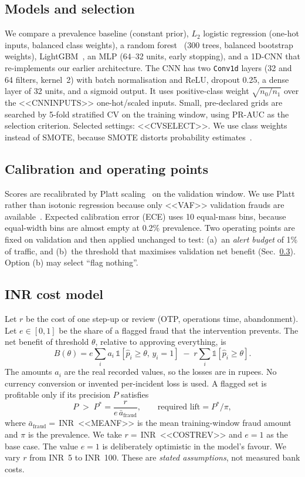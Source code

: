 \documentclass[conference]{IEEEtran}
\newcommand{\inr}{INR~}
\begin{document}
\subsection{Models and selection}\label{sec:models}
We compare a prevalence baseline (constant prior), $L_2$ logistic regression (one-hot inputs, balanced class weights), a random forest~\cite{breiman2001} (300 trees, balanced bootstrap weights), LightGBM~\cite{ke2017}, an MLP (64--32 units, early stopping), and a 1D-CNN that re-implements our earlier architecture. The CNN has two \texttt{Conv1d} layers (32 and 64 filters, kernel~2) with batch normalisation and ReLU, dropout 0.25, a dense layer of 32 units, and a sigmoid output. It uses positive-class weight $\sqrt{n_0/n_1}$ over the <<CNNINPUTS>> one-hot/scaled inputs. Small, pre-declared grids are searched by 5-fold stratified CV on the training window, using PR-AUC as the selection criterion. Selected settings: <<CVSELECT>>. We use class weights instead of SMOTE, because SMOTE distorts probability estimates~\cite{dalpozzolo2015}.

\subsection{Calibration and operating points}
Scores are recalibrated by Platt scaling~\cite{platt1999} on the validation window. We use Platt rather than isotonic regression because only <<VAF>> validation frauds are available~\cite{niculescu2005}. Expected calibration error (ECE) uses 10 equal-mass bins, because equal-width bins are almost empty at 0.2\% prevalence. Two operating points are fixed on validation and then applied unchanged to test: (a)~an \emph{alert budget} of 1\% of traffic, and (b)~the threshold that maximises validation net benefit (Sec.~\ref{sec:cost}). Option (b) may select ``flag nothing''.

\subsection{INR cost model}\label{sec:cost}
Let $r$ be the cost of one step-up or review (OTP, operations time, abandonment). Let $e\in[0,1]$ be the share of a flagged fraud that the intervention prevents. The net benefit of threshold $\theta$, relative to approving everything, is
\begin{equation}
B(\theta) = e \sum_{i} a_i\,\mathbb{1}[\hat p_i\ge\theta,\,y_i=1] \;-\; r \sum_i \mathbb{1}[\hat p_i\ge\theta].
\end{equation}
The amounts $a_i$ are the real recorded values, so the losses are in rupees. No currency conversion or invented per-incident loss is used. A flagged set is profitable only if its precision $P$ satisfies
\begin{equation}
P \;>\; P^{*} = \frac{r}{e\,\bar a_{\text{fraud}}}, \qquad \text{required lift} = P^{*}/\pi,
\end{equation}
where $\bar a_{\text{fraud}}=$\,\inr<<MEANF>> is the mean training-window fraud amount and $\pi$ is the prevalence. We take $r=$\,\inr<<COSTREV>> and $e=1$ as the base case. The value $e=1$ is deliberately optimistic in the model's favour. We vary $r$ from \inr5 to \inr100. These are \emph{stated assumptions}, not measured bank costs.
\end{document}

